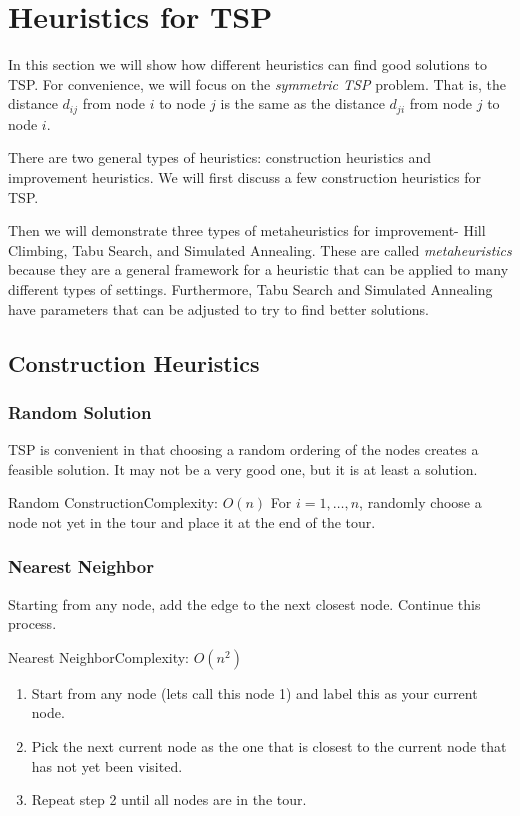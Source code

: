 
\chapter{Heuristics for TSP}

In this section we will show how different heuristics can find good solutions to TSP.  For convenience,  we will focus on the \emph{symmetric TSP} problem.  That is, the distance $d_{ij}$ from node $i$ to node $j$ is the same as the distance $d_{ji}$ from node $j$ to node $i$.

There are two general types of heuristics: construction heuristics and improvement heuristics.  We will first discuss a few construction heuristics for TSP.

Then we will demonstrate three types of metaheuristics for improvement- Hill Climbing, Tabu Search, and Simulated Annealing.  These are called \emph{metaheuristics} because they are a general framework for a heuristic that can be applied to many different types of settings.  Furthermore, Tabu Search and Simulated Annealing have parameters that can be adjusted to try to find better solutions.  

\section{Construction Heuristics}
\subsection{Random Solution}
TSP is convenient in that choosing a random ordering of the nodes creates a feasible solution.  It may not be a very good one, but it is at least a solution.

\begin{general}{Random Construction}{Complexity: $O(n)$}
\label{heuristic:random}
For $i=1, \dots, n$, randomly choose a node not yet in the tour and place it at the end of the tour.
\end{general}

\subsection{Nearest Neighbor}
Starting from any node, add the edge to the next closest node.  Continue this process.
\begin{general}{Nearest Neighbor}{Complexity: $O(n^2)$}
\label{heuristic:nearestNeighbor}
\begin{enumerate}
\item Start from any node (lets call this node 1) and label this as your current node.
\item Pick the next current node as the one that is closest to the current node that has not yet been visited.
\item Repeat step 2 until all nodes are in the tour.
\end{enumerate}
\end{general}

